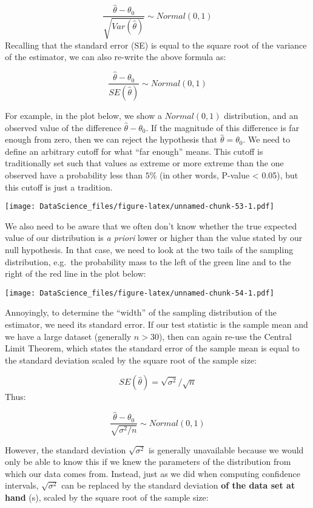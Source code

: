 \documentclass[
]{book}
\begin{document}
\[\frac{\hat{\theta} - \theta_0}{\sqrt{Var(\hat{\theta})}} \sim Normal(0, 1)\]
Recalling that the standard error (SE) is equal to the square root of the variance of the estimator, we can also re-write the above formula as:

\[\frac{\hat{\theta} - \theta_0}{SE(\hat{\theta})} \sim Normal(0, 1)\]

For example, in the plot below, we show a \(Normal(0,1)\) distribution, and an observed value of the difference \(\hat{\theta}-\theta_0\). If the magnitude of this difference is far enough from zero, then we can reject the hypothesis that \(\hat{\theta} = \theta_0\). We need to define an arbitrary cutoff for what ``far enough'' means. This cutoff is traditionally set such that values as extreme or more extreme than the one observed have a probability less than \(5\%\) (in other words, P-value \textless{} 0.05), but this cutoff is just a tradition.

\texttt{[image: DataScience\_files/figure-latex/unnamed-chunk-53-1.pdf]}

We also need to be aware that we often don't know whether the true expected value of our distribution is \emph{a priori} lower or higher than the value stated by our null hypothesis. In that case, we need to look at the two tails of the sampling distribution, e.g.~the probability mass to the left of the green line and to the right of the red line in the plot below:

\texttt{[image: DataScience\_files/figure-latex/unnamed-chunk-54-1.pdf]}

Annoyingly, to determine the ``width'' of the sampling distribution of the estimator, we need its standard error. If our test statistic is the sample mean and we have a large dataset (generally \(n>30\)), then can again re-use the Central Limit Theorem, which states the standard error of the sample mean is equal to the standard deviation scaled by the square root of the sample size:

\[SE(\hat{\theta}) = \sqrt{\sigma^2}/\sqrt{n}\]
Thus:

\[\frac{\hat{\theta} - \theta_0}{\sqrt{\sigma^2/n}} \sim Normal(0, 1)\]

However, the standard deviation \(\sqrt{\sigma^2}\) is generally unavailable because we would only be able to know this if we knew the parameters of the distribution from which our data comes from. Instead, just as we did when computing confidence intervals, \(\sqrt{\sigma^2}\) can be replaced by the standard deviation \textbf{of the data set at hand} (s), scaled by the square root of the sample size:
\end{document}
